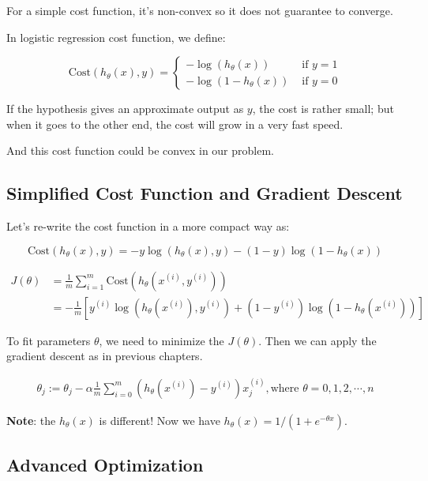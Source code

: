 \documentclass[black,simple]{../elegantbook}
\begin{document}
For a simple cost function, it's non-convex so it does not guarantee to converge.

In logistic regression cost function, we define:

\[
\text{Cost}\left(h_\theta(x), y\right) = \left\{
\begin{aligned}
    - \log (h_\theta(x)) & \text{ if } y = 1\\
    - \log (1 - h_\theta(x)) & \text{ if } y = 0
\end{aligned}    
\right.
\]

If the hypothesis gives an approximate output as \(y\), the cost is rather small; but when it goes to the other end, the cost will grow in a very fast speed.

And this cost function could be convex in our problem.

\subsection{Simplified Cost Function and Gradient Descent}

Let's re-write the cost function in a more compact way as: 

\[\text{Cost}\left(h_\theta(x), y\right) = -y \log (h_\theta(x), y) - (1-y) \log (1-h_\theta(x))\]

\[
\begin{aligned}
    J(\theta) &= \frac{1}{m} \sum_{i = 1}^m \text{Cost} (h_\theta(x^{(i)}, y^{(i)})) \\
    &=  -\frac{1}{m}\left[y^{(i)} \log (h_\theta(x^{(i)}), y^{(i)}) + (1-y^{(i)}) \log (1-h_\theta(x^{(i)}))\right]
\end{aligned}    
\]

To fit parameters \(\theta\), we need to minimize the \(J(\theta)\). Then we can apply the gradient descent as in previous chapters.


\[\begin{aligned}
    \theta_j := \theta_j - \alpha \frac{1}{m} \sum_{i = 0}^m (h_\theta(x^{(i)}) - y^{(i)})x_j^{(i)}, \text{where } \theta = 0, 1, 2, \cdots , n
\end{aligned}\]

\textbf{Note}: the \(h_\theta(x)\) is different! Now we have \(h_\theta(x) = 1 / (1 + e^{-\theta x})\).

\subsection{Advanced Optimization}
\end{document}
